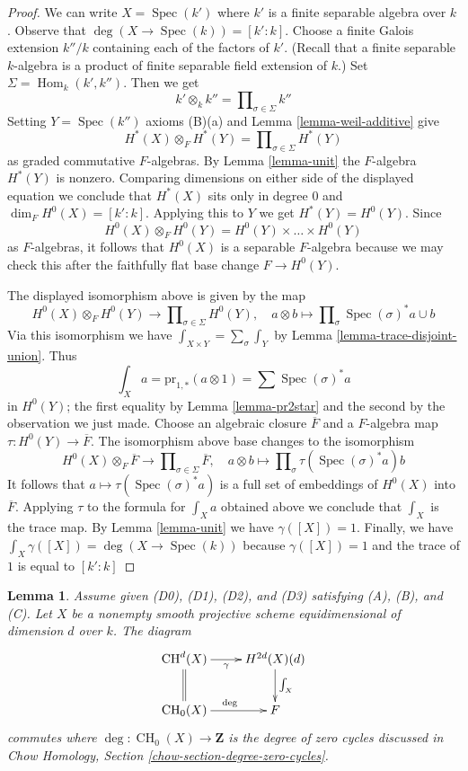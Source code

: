 \documentclass{stacks-project}
\theoremstyle{plain}
\newtheorem{lemma}[subsection]{Lemma}
\theoremstyle{definition}
\theoremstyle{remark}
\numberwithin{equation}{subsection}
\def\Spec{\mathop{\mathrm{Spec}}}
\def\Hom{\mathop{\mathrm{Hom}}\nolimits}
\def\CH{\mathop{\mathrm{CH}}\nolimits}
\begin{document}
\begin{proof}
We can write $X = \Spec(k')$ where $k'$ is a finite separable
algebra over $k$. Observe that $\deg(X \to \Spec(k)) = [k' : k]$.
Choose a finite Galois extension $k''/k$ containing each of the
factors of $k'$. (Recall that a finite separable $k$-algebra is
a product of finite separable field extension of $k$.)
Set $\Sigma = \Hom_k(k', k'')$. Then we get
$$
k' \otimes_k k'' = \prod\nolimits_{\sigma \in \Sigma} k''
$$
Setting $Y = \Spec(k'')$ axioms (B)(a) and Lemma \ref{lemma-weil-additive} give
$$
H^*(X) \otimes_F H^*(Y) =
\prod\nolimits_{\sigma \in \Sigma} H^*(Y)
$$
as graded commutative $F$-algebras. By Lemma \ref{lemma-unit} the
$F$-algebra $H^*(Y)$ is nonzero. Comparing dimensions on either side
of the displayed equation we conclude that $H^*(X)$ sits only in degree $0$
and $\dim_F H^0(X) = [k' : k]$. Applying this to $Y$ we get
$H^*(Y) = H^0(Y)$. Since
$$
H^0(X) \otimes_F H^0(Y) = H^0(Y) \times \ldots \times H^0(Y)
$$
as $F$-algebras, it follows that $H^0(X)$ is a separable $F$-algebra
because we may check this after the faithfully flat base change
$F \to H^0(Y)$.

\medskip\noindent
The displayed isomorphism above is given by the map
$$
H^0(X) \otimes_F H^0(Y) \longrightarrow
\prod\nolimits_{\sigma \in \Sigma} H^0(Y),\quad
a \otimes b \longmapsto \prod\nolimits_\sigma \Spec(\sigma)^*a \cup b
$$
Via this isomorphism we have $\int_{X \times Y} = \sum_\sigma \int_Y$ by
Lemma \ref{lemma-trace-disjoint-union}. Thus
$$
\int_X a = \text{pr}_{1, *}(a \otimes 1) = \sum \Spec(\sigma)^*a
$$
in $H^0(Y)$; the first equality by Lemma \ref{lemma-pr2star}
and the second by the observation we just made. Choose an
algebraic closure $\overline{F}$ and
a $F$-algebra map $\tau : H^0(Y) \to \overline{F}$.
The isomorphism above base changes to the isomorphism
$$
H^0(X) \otimes_F \overline{F} \longrightarrow
\prod\nolimits_{\sigma \in \Sigma} \overline{F},\quad
a \otimes b \longmapsto \prod\nolimits_\sigma \tau(\Spec(\sigma)^*a) b
$$
It follows that $a \mapsto \tau(\Spec(\sigma)^*a)$ is a full set
of embeddings of $H^0(X)$ into $\overline{F}$. Applying $\tau$
to the formula for $\int_X a$ obtained above we conclude
that $\int_X$ is the trace map.
By Lemma \ref{lemma-unit} we have $\gamma([X]) = 1$.
Finally, we have $\int_X \gamma([X]) = \deg(X \to \Spec(k))$
because $\gamma([X]) = 1$ and the trace of $1$ is equal to $[k' : k]$
\end{proof}

\begin{lemma}
\label{lemma-degrees-cycles}
Assume given (D0), (D1), (D2), and (D3) satisfying (A), (B), and (C).
Let $X$ be a nonempty smooth projective scheme
equidimensional of dimension $d$ over $k$. The diagram
$$
\xymatrix{
\CH^d(X) \ar[r]_-\gamma \ar@{=}[d] &
H^{2d}(X)(d) \ar[d]^{\int_X} \\
\CH_0(X) \ar[r]^\deg & F
}
$$
commutes where $\deg : \CH_0(X) \to \mathbf{Z}$ is the degree of
zero cycles discussed in Chow Homology, Section
\ref{chow-section-degree-zero-cycles}.
\end{lemma}
\end{document}
